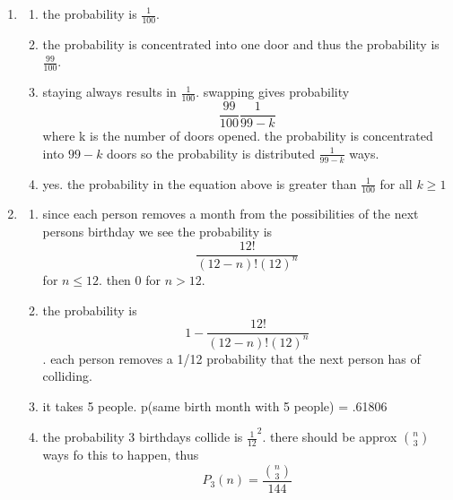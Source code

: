 \documentclass{article}
\begin{document}
\begin{enumerate}
\begin{enumerate}
    \end{enumerate}
    \item \begin{enumerate}
        \item the probability is \(\frac{1}{100}\). 
        \item the probability is concentrated into one door and thus the probability is \(\frac{99}{100}\).
        \item staying always results in \(\frac{1}{100}.\) swapping gives probability 
        \begin{equation}
            \frac{99}{100} \frac{1}{99-k}
        \end{equation}
        where k is the number of doors opened. the probability is concentrated into \(99-k\) doors so the probability is distributed \(\frac{1}{99-k}\) ways.
        \item yes. the probability in the equation above is greater than \(\frac{1}{100} \) for all \(k\geq 1\)
    \end{enumerate}
    \item \begin{enumerate}
        \item since each person removes a month from the possibilities of the next persons birthday we see the probability is \begin{equation}
            \frac{12!}{(12-n)!(12)^n}
        \end{equation}
        for \(n\leq 12\). then 0 for \(n>12\). 
        \item the probability is \begin{equation}
            1-\frac{12!}{(12-n)!(12)^n}
        \end{equation}.
        each person removes a 1/12 probability that the next person has of colliding. 
        \item it takes 5 people. p(same birth month with 5 people) = .61806
        \item the probability 3 birthdays collide is \(\frac{1}{12}^2\). there should be approx \({n\choose 3}\) ways fo this to happen, thus
        \begin{equation}
            P_3(n) = \frac{{n\choose 3}}{144}
        \end{equation}
    \end{enumerate}

\end{enumerate}
\end{document}
